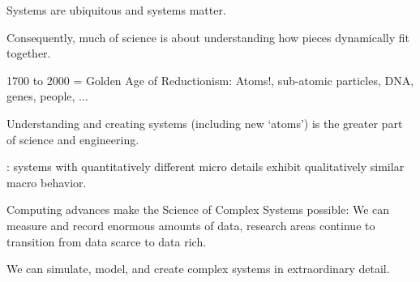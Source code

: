  \small


  \textbf{}
      Systems are ubiquitous and systems matter.
    
      Consequently, much of science is about understanding
      how pieces dynamically fit together.
    
      1700 to 2000 = Golden Age of Reductionism:\newline
      Atoms!, sub-atomic particles, DNA, genes, people, ...
    
      Understanding and creating systems (including new `atoms')
      is the greater part of science and engineering.
    
      : systems with quantitatively different micro details
      exhibit qualitatively similar macro behavior.
    
      Computing advances make the Science of Complex Systems possible:
        We can measure and record enormous amounts of data,
        research areas continue to transition from data scarce to data rich.
      
        We can simulate, model, and create complex systems
        in extraordinary detail.  
  
